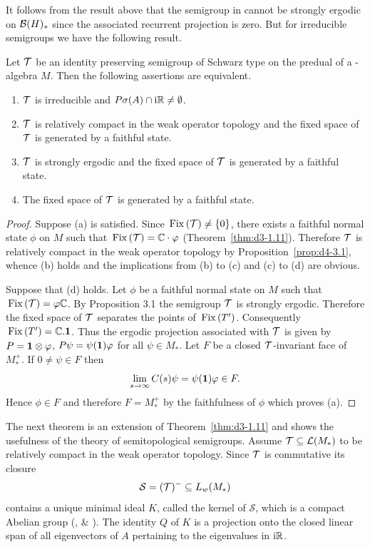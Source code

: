 It follows from the result above that the semigroup in \textcite{evans:1977} cannot be strongly ergodic on $\mathcal{B}(H)_{*}$ since the associated recurrent projection is zero.
But for irreducible semigroups we have the following result.
\begin{proposition}\label{prop:d4-3.4}
Let $\mathcal{T}$ be an identity preserving semigroup of Schwarz type on the predual of a \WA-algebra $M$.
Then the following assertions are equivalent.
\begin{enumerate}[\upshape (a)]
\item
$\mathcal{T}$ is irreducible and $P\sigma(A) \cap \mathrm{i}\mathbb{R} \neq \emptyset$.

\item
$\mathcal{T}$ is relatively compact in the weak operator topology and the fixed space of\/ $\mathcal{T}$ is generated by a faithful state.

\item
$\mathcal{T}$ is strongly ergodic and the fixed space of\/ $\mathcal{T}$ is generated by a faithful state.

\item
The fixed space of\/ $\mathcal{T}$ is generated by a faithful state.
\end{enumerate}
\end{proposition}
\begin{proof}
Suppose (a) is satisfied.
Since $\mathop{}\mathrm{Fix}\left(\mathcal{T}\right) \neq \{0\}$, there exists a faithful normal state $\phi$ on $M$ such that 
$\Fix{\TT} = \C \cdot \phi$ (Theorem~\ref{thm:d3-1.11}).
Therefore $\mathcal{T}$ is relatively compact in the weak operator topology by Proposition~\ref{prop:d4-3.1}, whence (b) holds and the  implications from (b) to (c) and (c) to (d) are obvious.

Suppose that (d) holds.
Let $\phi$ be a faithful normal state on $M$ such that $\Fix{\TT} = \phi\C$.
By Proposition 3.1 the semigroup $\mathcal{T}$ is strongly ergodic.
Therefore the fixed space of\/ $\mathcal{T}$ separates the points of\/ $\mathop{}\mathrm{Fix}\left(T'\right)$.
Consequently $\mathop{}\mathrm{Fix}\left(T'\right) = \mathbb{C}.\mathbf{1}$.
Thus the ergodic projection associated with $\mathcal{T}$ is given by $P = \1 \otimes \phi$, \ie $P\psi = \psi(\1)\phi$ for all $\psi \in M_{*}$.
Let $F$ be a closed $\mathcal{T}$-invariant face of\/ $M_{*}^{+}$.
If\/ $0 \neq \psi \in F$ then
\[
\lim_{s \to \infty} C(s)\psi = \psi(\1)\phi \in F.
\]
Hence $\phi \in F$ and therefore $F = M_{*}^{+}$ by the faithfulness of\/ $\phi$ which proves (a).
\end{proof}
The next theorem is an extension of Theorem~\ref{thm:d3-1.11} and shows the usefulness of the theory of semitopological semigroups.
Assume $\mathcal{T} \subseteq \mathcal{L}(M_{*})$ to be relatively compact in the weak operator topology. 
Since $\mathcal{T}$ is commutative its closure 
\[
\mathcal{S}  = (\mathcal{T})^{-} \subseteq L_{w}(M_{*})
\]
contains a unique minimal ideal $K$, called the kernel of\/ $\mathcal{S}$, which is a compact Abelian group (\textcite{deleeuw:1961}, \textcite{junghenn:1971} \& \textcite[§ 2.4]{krengel:1985}).
The identity $Q$ of\/ $K$ is a projection onto the closed linear span of all eigenvectors of\/ $ A $ pertaining to the eigenvalues in $ \mathrm{i}  \mathbb{R} $. 

